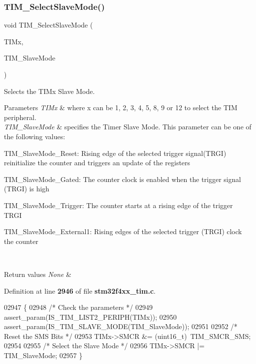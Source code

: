 \subsubsection{T\+I\+M\+\_\+\+Select\+Slave\+Mode()}
{\footnotesize\ttfamily void T\+I\+M\+\_\+\+Select\+Slave\+Mode (\begin{DoxyParamCaption}\item[{\textbf{ T\+I\+M\+\_\+\+Type\+Def} $\ast$}]{T\+I\+Mx,  }\item[{uint16\+\_\+t}]{T\+I\+M\+\_\+\+Slave\+Mode }\end{DoxyParamCaption})}



Selects the T\+I\+Mx Slave Mode. 


\begin{DoxyParams}{Parameters}
{\em T\+I\+Mx} & where x can be 1, 2, 3, 4, 5, 8, 9 or 12 to select the T\+IM peripheral. \\
\hline
{\em T\+I\+M\+\_\+\+Slave\+Mode} & specifies the Timer Slave Mode. This parameter can be one of the following values\+: \begin{DoxyItemize}
\item T\+I\+M\+\_\+\+Slave\+Mode\+\_\+\+Reset\+: Rising edge of the selected trigger signal(\+T\+R\+G\+I) reinitialize the counter and triggers an update of the registers \item T\+I\+M\+\_\+\+Slave\+Mode\+\_\+\+Gated\+: The counter clock is enabled when the trigger signal (T\+R\+GI) is high \item T\+I\+M\+\_\+\+Slave\+Mode\+\_\+\+Trigger\+: The counter starts at a rising edge of the trigger T\+R\+GI \item T\+I\+M\+\_\+\+Slave\+Mode\+\_\+\+External1\+: Rising edges of the selected trigger (T\+R\+GI) clock the counter \end{DoxyItemize}
\\
\hline
\end{DoxyParams}

\begin{DoxyRetVals}{Return values}
{\em None} & \\
\hline
\end{DoxyRetVals}


Definition at line \textbf{ 2946} of file \textbf{ stm32f4xx\+\_\+tim.\+c}.


\begin{DoxyCode}
02947 \{
02948   \textcolor{comment}{/* Check the parameters */}
02949   assert_param(IS_TIM_LIST2_PERIPH(TIMx));
02950   assert_param(IS_TIM_SLAVE_MODE(TIM\_SlaveMode));
02951 
02952   \textcolor{comment}{/* Reset the SMS Bits */}
02953   TIMx->SMCR &= (uint16\_t)~TIM_SMCR_SMS;
02954 
02955   \textcolor{comment}{/* Select the Slave Mode */}
02956   TIMx->SMCR |= TIM\_SlaveMode;
02957 \}
\end{DoxyCode}
